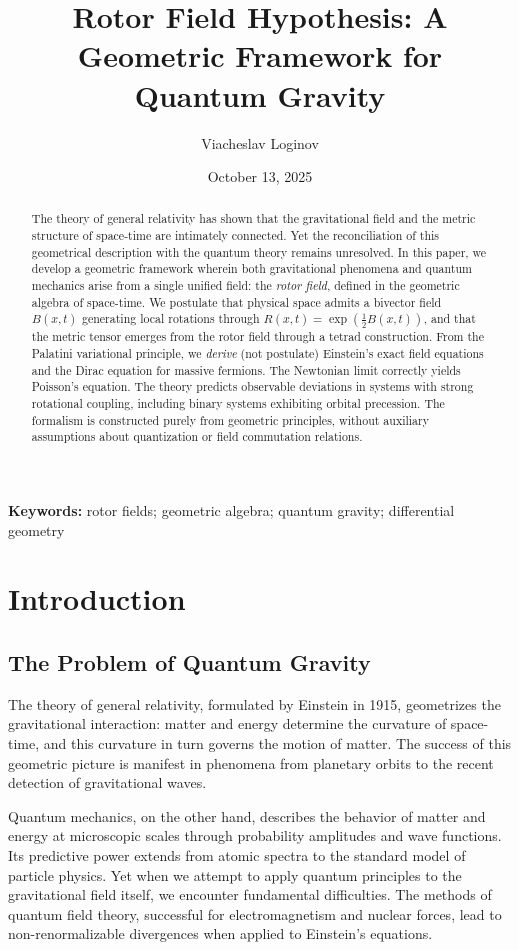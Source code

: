 \documentclass[11pt,a4paper]{article}
\title{Rotor Field Hypothesis: A Geometric Framework for Quantum Gravity}
\author[1]{Viacheslav Loginov}
\affil[1]{Kyiv, Ukraine\\ \texttt{barthez.slavik@gmail.com}}
\date{October 13, 2025}
\numberwithin{equation}{section}
\theoremstyle{plain}
\theoremstyle{definition}
\theoremstyle{remark}
\newcommand{\keywords}{\textbf{Keywords:} rotor fields; geometric algebra; quantum gravity; differential geometry}
\begin{document}
\maketitle

\begin{abstract}
The theory of general relativity has shown that the gravitational field and the metric structure of space-time are intimately connected. Yet the reconciliation of this geometrical description with the quantum theory remains unresolved. In this paper, we develop a geometric framework wherein both gravitational phenomena and quantum mechanics arise from a single unified field: the \emph{rotor field}, defined in the geometric algebra of space-time. We postulate that physical space admits a bivector field $B(x,t)$ generating local rotations through $R(x,t)=\exp(\frac{1}{2}B(x,t))$, and that the metric tensor emerges from the rotor field through a tetrad construction. From the Palatini variational principle, we \emph{derive} (not postulate) Einstein's exact field equations and the Dirac equation for massive fermions. The Newtonian limit correctly yields Poisson's equation. The theory predicts observable deviations in systems with strong rotational coupling, including binary systems exhibiting orbital precession. The formalism is constructed purely from geometric principles, without auxiliary assumptions about quantization or field commutation relations.
\end{abstract}

\keywords

\section{Introduction}
\label{sec:intro}

\subsection{The Problem of Quantum Gravity}

The theory of general relativity, formulated by Einstein in 1915, geometrizes the gravitational interaction: matter and energy determine the curvature of space-time, and this curvature in turn governs the motion of matter. The success of this geometric picture is manifest in phenomena from planetary orbits to the recent detection of gravitational waves.

Quantum mechanics, on the other hand, describes the behavior of matter and energy at microscopic scales through probability amplitudes and wave functions. Its predictive power extends from atomic spectra to the standard model of particle physics. Yet when we attempt to apply quantum principles to the gravitational field itself, we encounter fundamental difficulties. The methods of quantum field theory, successful for electromagnetism and nuclear forces, lead to non-renormalizable divergences when applied to Einstein's equations.
\end{document}
